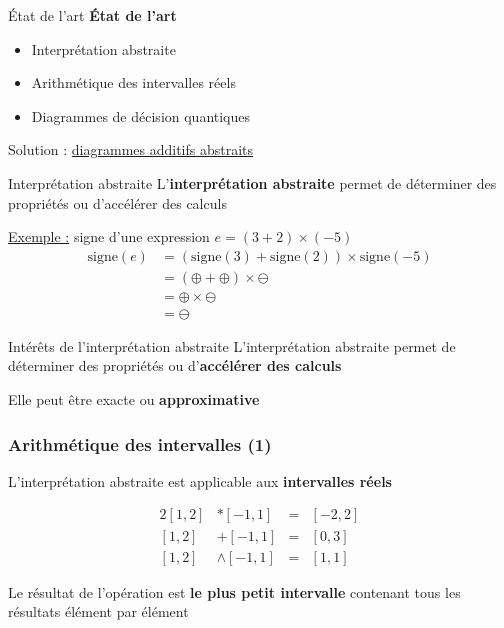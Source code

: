 \begin{frame}{État de l'art}
    \textbf{État de l'art}
    \begin{itemize}
        \item Interprétation abstraite
        \item Arithmétique des intervalles réels
        \item Diagrammes de décision quantiques
    \end{itemize}
    \pause
    \begin{center}
        Solution : \underline{diagrammes additifs abstraits}
    \end{center}
\end{frame}

\begin{frame}{Interprétation abstraite}
    L'\textbf{interprétation abstraite} permet de déterminer des propriétés ou d'accélérer des calculs

    \vspace{1em}
    \underline{Exemple :} signe d'une expression $e = (3 + 2) \times (-5)$
    \begin{align*}
        \text{signe}(e) &= (\text{signe}(3) + \text{signe}(2)) \times \text{signe}(-5) \\
        &= (\oplus + \oplus) \times \ominus \\
        &= \oplus \times \ominus \\
        &= \ominus
    \end{align*}
\end{frame}

\begin{frame}{Intérêts de l'interprétation abstraite}
    L'interprétation abstraite permet de déterminer des propriétés ou d'\textbf{accélérer des calculs}

    \vspace{1em}

    Elle peut être exacte ou \textbf{approximative}
\end{frame}

\begin{frame}
    \frametitle{Arithmétique des intervalles (1)}

    L'interprétation abstraite est applicable aux \textbf{intervalles réels}

    \begin{alignat*}{2}
    [1, 2] &* [-1, 1] &=& [-2, 2] \\
    [1, 2] &+ [-1, 1] &=& [0, 3] \\
    [1, 2] &\land [-1, 1] &=& [1, 1]
    \end{alignat*}

    \small{Le résultat de l'opération est \textbf{le plus petit intervalle} contenant tous les résultats élément par élément}
\end{frame}

